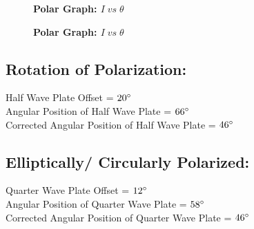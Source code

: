     \begin{figure}[H]
        \centering
        \caption{\textbf{Polar Graph: $I\;vs\;\theta$}}
        \label{fig:10}
    \end{figure}

    \begin{figure}[H]
        \centering
        \caption{\textbf{Polar Graph: $I\;vs\;\theta$}}
        \label{fig:11}
    \end{figure}

    \subsection{Rotation of Polarization:}

    \vspace{0.1cm}
    \noindent Half Wave Plate Offset = $20\degree$ \\
    Angular Position of Half Wave Plate = $66\degree$ \\
    Corrected Angular Position of Half Wave Plate = $46\degree$

    

    \vspace{-1cm}
    \subsection{Elliptically/ Circularly Polarized:}

    \noindent Quarter Wave Plate Offset = $12\degree$ \\
    Angular Position of Quarter Wave Plate = $58\degree$\\
    Corrected Angular Position of Quarter Wave Plate = $46\degree$\\
    
    